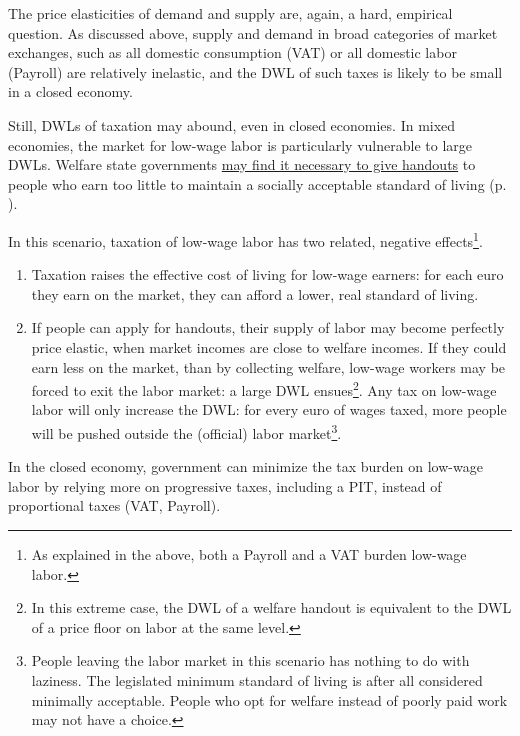 The price elasticities of demand and supply are, again, a hard, empirical question. As discussed above, supply and demand in broad categories of market exchanges, such as all domestic consumption (\gls{VAT}) or all domestic labor (\gls{Payroll}) are relatively inelastic, and the \gls{DWL} of such taxes is likely to be small in a closed economy.

Still, \glspl{DWL} of taxation may abound, even in closed economies. In mixed economies, the market for low-wage labor is particularly vulnerable to large \gls{DWL}s. Welfare state governments  \hyperref[sec:distribution]{may find it necessary to give handouts} to people who earn too little to maintain a socially acceptable standard of living (p. \pageref{sec:distribution}). 

In this scenario, taxation of low-wage labor has two related, negative effects\footnote{
	As explained in the above, both a \gls{Payroll} and a \gls{VAT} burden low-wage labor.}. 
\begin{enumerate}
	\item Taxation raises the effective cost of living for low-wage earners: for each euro they earn on the market, they can afford a lower, real standard of living. 
	\item If people can apply for handouts, their supply of labor may become perfectly price elastic, when market incomes are close to welfare incomes. If they could earn less on the market, than by collecting welfare, low-wage workers may be forced to exit the labor market: a large \gls{DWL} ensues\footnote{
		In this extreme case, the \gls{DWL} of a welfare handout is equivalent to the \gls{DWL} of a price floor on labor at the same level.}. 
	Any tax on low-wage labor will only increase the \gls{DWL}: for every euro of wages taxed, more people will be pushed outside the (official) labor market\footnote{
		People leaving the labor market in this scenario has nothing to do with laziness. The legislated minimum standard of living is after all considered minimally acceptable. People who opt for welfare instead of poorly paid work may not have a choice.}. 
\end{enumerate}

In the closed economy, government can minimize the tax burden on low-wage labor by relying more on progressive taxes, including a \gls{PIT}, instead of proportional taxes (\gls{VAT}, \gls{Payroll}).


